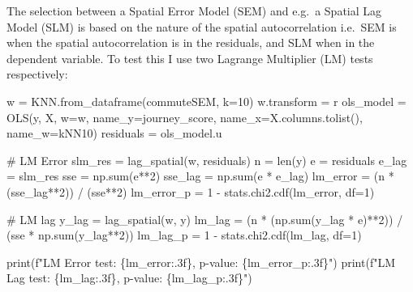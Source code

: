 \documentclass[
  number]{elsarticle}
\newenvironment{Shaded}{\begin{snugshade}}{\end{snugshade}}
\newcommand{\BuiltInTok}[1]{\textcolor[rgb]{0.00,0.23,0.31}{#1}}
\newcommand{\CommentTok}[1]{\textcolor[rgb]{0.37,0.37,0.37}{#1}}
\newcommand{\DecValTok}[1]{\textcolor[rgb]{0.68,0.00,0.00}{#1}}
\newcommand{\NormalTok}[1]{\textcolor[rgb]{0.00,0.23,0.31}{#1}}
\newcommand{\OperatorTok}[1]{\textcolor[rgb]{0.37,0.37,0.37}{#1}}
\newcommand{\SpecialCharTok}[1]{\textcolor[rgb]{0.37,0.37,0.37}{#1}}
\newcommand{\SpecialStringTok}[1]{\textcolor[rgb]{0.13,0.47,0.30}{#1}}
\newcommand{\StringTok}[1]{\textcolor[rgb]{0.13,0.47,0.30}{#1}}
\begin{document}
The selection between a Spatial Error Model (SEM) and e.g.~a Spatial Lag
Model (SLM) is based on the nature of the spatial autocorrelation
i.e.~SEM is when the spatial autocorrelation is in the residuals, and
SLM when in the dependent variable. To test this I use two Lagrange
Multiplier (LM) tests respectively:

\begin{Shaded}
\begin{Highlighting}[]
\NormalTok{w }\OperatorTok{=}\NormalTok{ KNN.from\_dataframe(commuteSEM, k}\OperatorTok{=}\DecValTok{10}\NormalTok{)}
\NormalTok{w.transform }\OperatorTok{=} \StringTok{\textquotesingle{}r\textquotesingle{}}
\NormalTok{ols\_model }\OperatorTok{=}\NormalTok{ OLS(y, X, w}\OperatorTok{=}\NormalTok{w, name\_y}\OperatorTok{=}\StringTok{\textquotesingle{}journey\_score\textquotesingle{}}\NormalTok{, name\_x}\OperatorTok{=}\NormalTok{X.columns.tolist(), name\_w}\OperatorTok{=}\StringTok{\textquotesingle{}kNN10\textquotesingle{}}\NormalTok{)}
\NormalTok{residuals }\OperatorTok{=}\NormalTok{ ols\_model.u }

\CommentTok{\# LM Error}
\NormalTok{slm\_res }\OperatorTok{=}\NormalTok{ lag\_spatial(w, residuals)}
\NormalTok{n }\OperatorTok{=} \BuiltInTok{len}\NormalTok{(y)}
\NormalTok{e }\OperatorTok{=}\NormalTok{ residuals}
\NormalTok{e\_lag }\OperatorTok{=}\NormalTok{ slm\_res}
\NormalTok{sse }\OperatorTok{=}\NormalTok{ np.}\BuiltInTok{sum}\NormalTok{(e}\OperatorTok{**}\DecValTok{2}\NormalTok{)}
\NormalTok{sse\_lag }\OperatorTok{=}\NormalTok{ np.}\BuiltInTok{sum}\NormalTok{(e }\OperatorTok{*}\NormalTok{ e\_lag)}
\NormalTok{lm\_error }\OperatorTok{=}\NormalTok{ (n }\OperatorTok{*}\NormalTok{ (sse\_lag}\OperatorTok{**}\DecValTok{2}\NormalTok{)) }\OperatorTok{/}\NormalTok{ (sse}\OperatorTok{**}\DecValTok{2}\NormalTok{)}
\NormalTok{lm\_error\_p }\OperatorTok{=} \DecValTok{1} \OperatorTok{{-}}\NormalTok{ stats.chi2.cdf(lm\_error, df}\OperatorTok{=}\DecValTok{1}\NormalTok{)}

\CommentTok{\# LM lag}
\NormalTok{y\_lag }\OperatorTok{=}\NormalTok{ lag\_spatial(w, y)}
\NormalTok{lm\_lag }\OperatorTok{=}\NormalTok{ (n }\OperatorTok{*}\NormalTok{ (np.}\BuiltInTok{sum}\NormalTok{(y\_lag }\OperatorTok{*}\NormalTok{ e)}\OperatorTok{**}\DecValTok{2}\NormalTok{)) }\OperatorTok{/}\NormalTok{ (sse }\OperatorTok{*}\NormalTok{ np.}\BuiltInTok{sum}\NormalTok{(y\_lag}\OperatorTok{**}\DecValTok{2}\NormalTok{))}
\NormalTok{lm\_lag\_p }\OperatorTok{=} \DecValTok{1} \OperatorTok{{-}}\NormalTok{ stats.chi2.cdf(lm\_lag, df}\OperatorTok{=}\DecValTok{1}\NormalTok{)}

\BuiltInTok{print}\NormalTok{(}\SpecialStringTok{f"LM Error test: }\SpecialCharTok{\{}\NormalTok{lm\_error}\SpecialCharTok{:.3f\}}\SpecialStringTok{, p{-}value: }\SpecialCharTok{\{}\NormalTok{lm\_error\_p}\SpecialCharTok{:.3f\}}\SpecialStringTok{"}\NormalTok{)}
\BuiltInTok{print}\NormalTok{(}\SpecialStringTok{f"LM Lag test: }\SpecialCharTok{\{}\NormalTok{lm\_lag}\SpecialCharTok{:.3f\}}\SpecialStringTok{, p{-}value: }\SpecialCharTok{\{}\NormalTok{lm\_lag\_p}\SpecialCharTok{:.3f\}}\SpecialStringTok{"}\NormalTok{)}
\end{Highlighting}
\end{Shaded}
\end{document}
